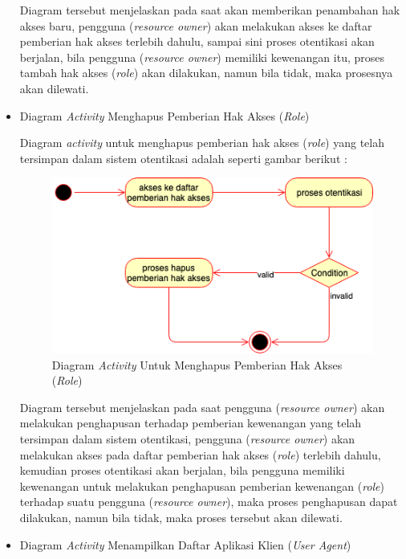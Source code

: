\documentclass[pdftex,12pt, oneside]{article}
\begin{document}
\begin{itemize}
	Diagram tersebut menjelaskan pada saat akan memberikan penambahan hak akses baru, pengguna (\textit{resource owner}) akan melakukan akses ke daftar pemberian hak akses terlebih dahulu, sampai sini proses otentikasi akan berjalan, bila pengguna (\textit{resource owner}) memiliki kewenangan itu, proses tambah hak akses (\textit{role}) akan dilakukan, namun bila tidak, maka prosesnya akan dilewati.
	
	\item Diagram \textit{Activity} Menghapus Pemberian Hak Akses (\textit{Role})
	
	Diagram \textit{activity} untuk menghapus pemberian hak akses (\textit{role}) yang telah tersimpan dalam sistem otentikasi adalah seperti gambar berikut :
	
	\begin{figure}[H]
		\centering
		\includegraphics[width=1\textwidth]{./resources/act-dia-remove-user-role}
		\caption{Diagram \textit{Activity} Untuk Menghapus Pemberian Hak Akses (\textit{Role})}
		\label{fig:act-dia-remove-user-role}
	\end{figure}
	
	Diagram tersebut menjelaskan pada saat pengguna (\textit{resource owner}) akan melakukan penghapusan terhadap pemberian kewenangan yang telah tersimpan dalam sistem otentikasi, pengguna (\textit{resource owner}) akan melakukan akses pada daftar pemberian hak akses (\textit{role}) terlebih dahulu, kemudian proses otentikasi akan berjalan, bila pengguna memiliki kewenangan untuk melakukan penghapusan pemberian kewenangan (\textit{role}) terhadap suatu pengguna (\textit{resource owner}), maka proses penghapusan dapat dilakukan, namun bila tidak, maka proses tersebut akan dilewati.
	
	\item Diagram \textit{Activity} Menampilkan Daftar Aplikasi Klien (\textit{User Agent})
	

\end{itemize}
\end{document}

